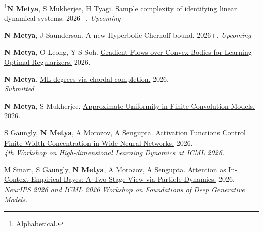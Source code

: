 \begin{etaremune}[leftmargin=13pt]

\item {\footnote{Alphabetical.}\color{grey}\textbf{N Metya}, S Mukherjee, H Tyagi}. {Sample complexity of identifying linear dynamical systems. 2026+.} \textit{Upcoming}\vspace{-5pt}


\item {\footnotemark[\value{footnote}]\color{grey}\textbf{N Metya}, J Saunderson.} {A new Hyperbolic Chernoff bound. 2026+.} \textit{Upcoming}\vspace{-5pt}

\item {\color{grey}\textbf{N Metya}, O Leong, Y S Soh}. \href{https://arxiv.org/abs/2611.16142}{Gradient Flows over Convex Bodies for Learning Optimal Regularizers.} 2026. \vspace{-5pt}


\item {\color{grey}\textbf{N Metya}}. \href{https://arxiv.org/abs/2610.19669}{ML degrees via chordal completion.} 2026.\\\textit{Submitted} \vspace{-5pt}

\item {\footnotemark[\value{footnote}]\color{grey}\textbf{N Metya}, S Mukherjee}. \href{https://arxiv.org/abs/2609.38243}{Approximate Uniformity in Finite Convolution Models.} 2026. \vspace{-5pt}

\item {\footnotemark[\value{footnote}]\color{grey}S Gaungly, \textbf{N Metya}, A Morozov, A Sengupta}. \href{https://openreview.net/pdf?id=x1PXM6FjVo}{Activation Functions Control Finite-Width Concentration in Wide Neural Networks.} 2026. \\
\textit{4th Workshop on High-dimensional Learning Dynamics at ICML 2026.}\vspace{-5pt}


\item {\color{grey}M Smart, S Gaungly, \textbf{N Metya}, A Morozov, A Sengupta}. \href{https://arxiv.org/pdf/2605.29351}{Attention as In-Context Empirical Bayes: A Two-Stage View via Particle Dynamics.} 2026. \\
\textit{NeurIPS 2026 and ICML 2026 Workshop on Foundations of Deep Generative Models.}\vspace{-5pt}


\end{etaremune}

